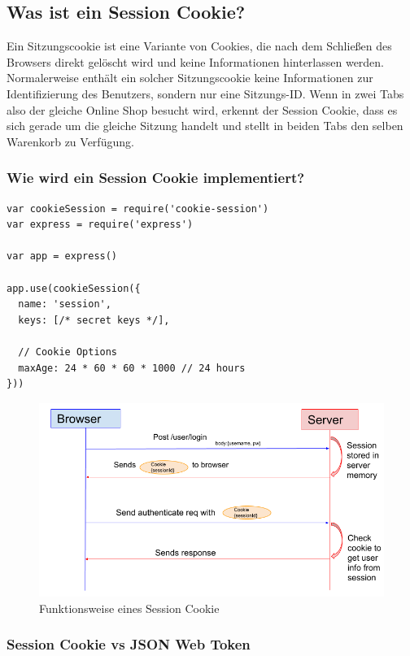 \subsection{Was ist ein Session Cookie?}


Ein Sitzungscookie ist eine Variante von Cookies, die nach dem Schließen des Browsers direkt gelöscht wird und keine Informationen hinterlassen werden. Normalerweise enthält ein solcher Sitzungscookie keine Informationen zur Identifizierung des Benutzers, sondern nur eine Sitzungs-ID.
Wenn in zwei Tabs also der gleiche Online Shop besucht wird, erkennt der Session Cookie, dass es sich gerade um die gleiche Sitzung handelt und stellt in beiden Tabs den selben Warenkorb zu Verfügung.

\subsubsection{Wie wird ein Session Cookie implementiert?}

\begin{lstlisting}
var cookieSession = require('cookie-session')
var express = require('express')

var app = express()

app.use(cookieSession({
  name: 'session',
  keys: [/* secret keys */],

  // Cookie Options
  maxAge: 24 * 60 * 60 * 1000 // 24 hours
}))
\end{lstlisting}


\begin{figure}[h!]
    \centering
    \includegraphics[width=0.7\linewidth]{pics/session-cookie-funktion.png}
    \caption{Funktionsweise eines Session Cookie}
    \label{fig:enter-label}
\end{figure}

\subsubsection{Session Cookie vs JSON Web Token}

